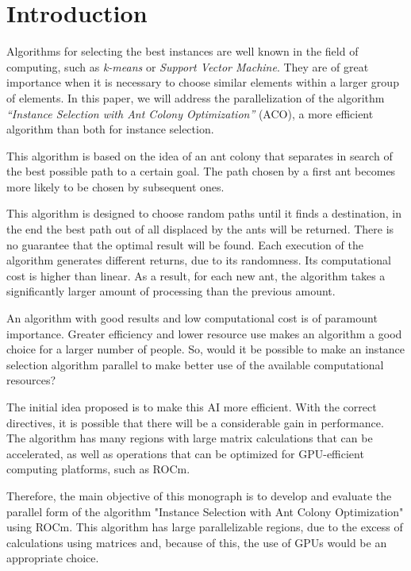 \section{Introduction}

Algorithms for selecting the best instances are well known in the field of computing, such as \emph{k-means} or \emph{Support Vector Machine}. They are of great importance when it is necessary to choose similar elements within a larger group of elements. In this paper, we will address the parallelization of the algorithm \emph{``Instance Selection with Ant Colony Optimization''} (ACO), a more efficient algorithm than both for instance selection.

This algorithm is based on the idea of an ant colony that separates in search of the best possible path to a certain goal. The path chosen by a first ant becomes more likely to be chosen by subsequent ones.

This algorithm is designed to choose random paths until it finds a destination, in the end the best path out of all displaced by the ants will be returned. There is no guarantee that the optimal result will be found. Each execution of the algorithm generates different returns, due to its randomness. Its computational cost is higher than linear. As a result, for each new ant, the algorithm takes a significantly larger amount of processing than the previous amount.

An algorithm with good results and low computational cost is of paramount importance. Greater efficiency and lower resource use makes an algorithm a good choice for a larger number of people. So, would it be possible to make an instance selection algorithm parallel to make better use of the available computational resources?

The initial idea proposed is to make this AI more efficient. With the correct directives, it is possible that there will be a considerable gain in performance. The algorithm has many regions with large matrix calculations that can be accelerated, as well as operations that can be optimized for GPU-efficient computing platforms, such as ROCm.

Therefore, the main objective of this monograph is to develop and evaluate the parallel form of the algorithm "Instance Selection with Ant Colony Optimization" using ROCm. This algorithm has large parallelizable regions, due to the excess of calculations using matrices and, because of this, the use of GPUs would be an appropriate choice.

